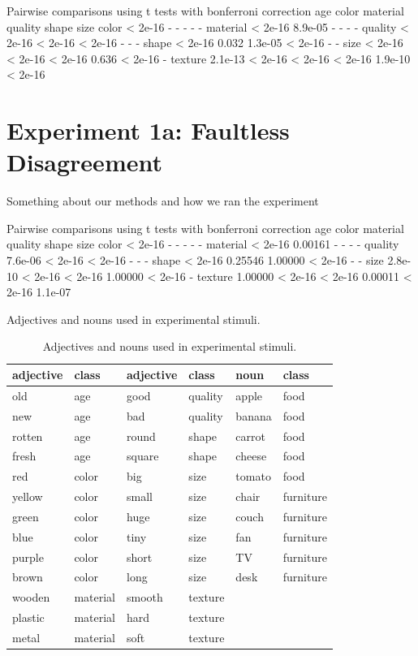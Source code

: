 \documentclass{pnastwo}
\begin{document}
\begin{article}
\begin{materials}
Pairwise comparisons using t tests with bonferroni correction
         age     color   material quality shape   size   
         color    < 2e-16 -       -        -       -       -      
         material < 2e-16 8.9e-05 -        -       -       -      
         quality  < 2e-16 < 2e-16 < 2e-16  -       -       -      
         shape    < 2e-16 0.032   1.3e-05  < 2e-16 -       -      
         size     < 2e-16 < 2e-16 < 2e-16  0.636   < 2e-16 -      
         texture  2.1e-13 < 2e-16 < 2e-16  < 2e-16 1.9e-10 < 2e-16

\section{Experiment 1a: Faultless Disagreement}
Something about our methods and how we ran the experiment


Pairwise comparisons using t tests with bonferroni correction
		         age     color   material quality shape   size   
         color    < 2e-16 -       -        -       -       -      
         material < 2e-16 0.00161 -        -       -       -      
         quality  7.6e-06 < 2e-16 < 2e-16  -       -       -      
         shape    < 2e-16 0.25546 1.00000  < 2e-16 -       -      
         size     2.8e-10 < 2e-16 < 2e-16  1.00000 < 2e-16 -      
         texture  1.00000 < 2e-16 < 2e-16  0.00011 < 2e-16 1.1e-07

\begin{table}
	\caption{Adjectives and nouns used in experimental stimuli.}
	\begin{tabular}{@{\vrule height 10.5pt depth2pt  width0pt}llllll}
	\textbf{adjective}	&	\textbf{class}	&	\textbf{adjective}	&	\textbf{class}	&	\textbf{noun}	&	\textbf{class}	\\ \hline
old	&	age	&	good	&	quality	&	apple	&	food	\\
new	&	age	&	bad	&	quality	&	banana	&	food	\\
rotten	&	age	&	round	&	shape	&	carrot	&	food	\\
fresh	&	age	&	square	&	shape	&	cheese	&	food	\\
red	&	color	&	big	&	size	&	tomato	&	food	\\
yellow	&	color	&	small	&	size	&	chair	&	furniture	\\
green	&	color	&	huge	&	size	&	couch	&	furniture	\\
blue	&	color	&	tiny	&	size	&	fan	&	furniture	\\
purple	&	color	&	short	&	size	&	TV	&	furniture	\\
brown	&	color	&	long	&	size	&	desk	&	furniture	\\
wooden	&	material	&	smooth	&	texture	\\				
plastic	&	material	&	hard	&	texture	\\				
metal	&	material	&	soft	&	texture	\\													
	\end{tabular} \label{stim-table}\caption{Adjectives and nouns used in experimental stimuli.}
\end{table}


\end{materials}
\end{article}
\end{document}
